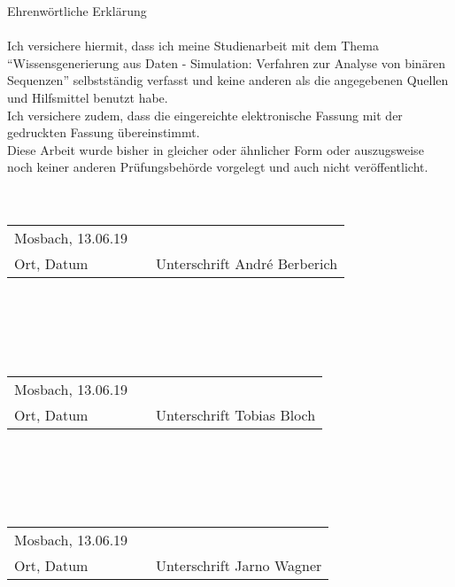 {\huge Ehrenwörtliche Erklärung}
\\
\\
Ich versichere hiermit, dass ich meine Studienarbeit mit dem Thema \enquote{Wissensgenerierung aus Daten - Simulation: Verfahren zur Analyse von binären Sequenzen} selbstständig verfasst und keine anderen als die angegebenen Quellen und Hilfsmittel benutzt habe.
\\
Ich versichere zudem, dass die eingereichte elektronische Fassung mit der gedruckten Fassung übereinstimmt.
\\
Diese Arbeit wurde bisher in gleicher oder ähnlicher Form oder auszugsweise noch keiner anderen Prüfungsbehörde vorgelegt und auch nicht veröffentlicht.
\\
\\
\\
\begin{tabular}{lp{2em}l} 
 Mosbach, 13.06.19 && \hspace{4cm} \\\cline{1-1}\cline{3-3} 
 Ort, Datum     && Unterschrift André Berberich
\end{tabular}
\\
\\
\\
\\
\begin{tabular}{lp{2em}l} 
	Mosbach, 13.06.19 && \hspace{4cm} \\\cline{1-1}\cline{3-3} 
	Ort, Datum     && Unterschrift Tobias Bloch
\end{tabular}
\\
\\
\\
\\
\begin{tabular}{lp{2em}l} 
	Mosbach, 13.06.19 && \hspace{4cm} \\\cline{1-1}\cline{3-3} 
	Ort, Datum     && Unterschrift Jarno Wagner
\end{tabular}
\newpage
 